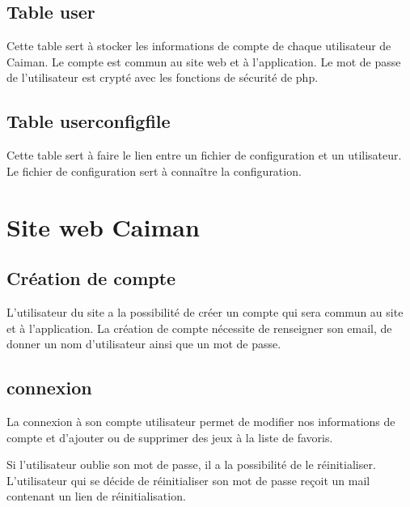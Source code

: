 \documentclass[a4paper,12pt,french]{sphinxmanual}
\begin{document}
\subsection{Table user}
\label{\detokenize{fonctionnelle:table-user}}
\sphinxAtStartPar
Cette table sert à stocker les informations de compte de chaque utilisateur de Caiman. Le compte est commun au site web et à l’application. Le mot de passe de l’utilisateur est crypté avec les fonctions de sécurité de php.


\subsection{Table userconfigfile}
\label{\detokenize{fonctionnelle:table-userconfigfile}}
\sphinxAtStartPar
Cette table sert à faire le lien entre un fichier de configuration et un utilisateur. Le fichier de configuration sert à connaître la configuration.


\section{Site web Caiman}
\label{\detokenize{fonctionnelle:site-web-caiman}}

\subsection{Création de compte}
\label{\detokenize{fonctionnelle:creation-de-compte}}
\sphinxAtStartPar
L’utilisateur du site a la possibilité de créer un compte qui sera commun au site et à l’application. La création de compte nécessite de renseigner son email, de donner un nom d’utilisateur ainsi que un mot de passe.

\sphinxAtStartPar
{}


\subsection{connexion}
\label{\detokenize{fonctionnelle:connexion}}
\sphinxAtStartPar
La connexion à son compte utilisateur permet de modifier nos informations de compte et d’ajouter ou de supprimer des jeux à la liste de favoris.

\sphinxAtStartPar
Si l’utilisateur oublie son mot de passe, il a la possibilité de le réinitialiser. L’utilisateur qui se décide de réinitialiser son mot de passe reçoit un mail contenant un lien de réinitialisation.

\sphinxAtStartPar
{}
\end{document}
